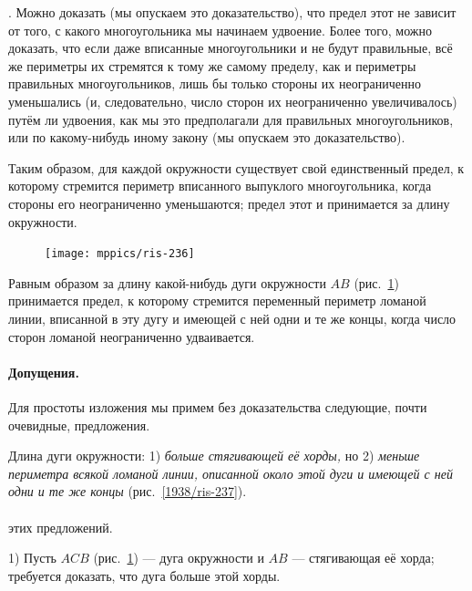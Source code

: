\documentclass[oneside]{book}
\begin{document}
.
Можно доказать (мы опускаем это доказательство), что предел этот не зависит от того, с какого многоугольника мы начинаем удвоение.
Более того, можно доказать, что если даже вписанные многоугольники и не будут правильные, всё же периметры их стремятся к тому же самому пределу, как и периметры правильных многоугольников, лишь бы только стороны их неограниченно уменьшались (и, следовательно, число сторон их неограниченно увеличивалось) путём ли удвоения, как мы это предполагали для правильных многоугольников, или по какому-нибудь иному закону (мы опускаем это доказательство).

Таким образом, для каждой окружности существует свой единственный предел, к которому стремится периметр вписанного выпуклого многоугольника, когда стороны его неограниченно уменьшаются;
предел этот и принимается за длину окружности.

\begin{figure}
\centering
\texttt{[image: mppics/ris-236]}
\caption{}\label{1938/ris-236}
\end{figure}

Равным образом за длину какой-нибудь дуги окружности $AB$ (рис.~\ref{1938/ris-236}) принимается предел, к которому стремится переменный периметр ломаной линии, вписанной в эту дугу и имеющей с ней одни и те же концы, когда число сторон ломаной неограниченно удваивается. %

\paragraph{Допущения.}\label{1938/235}
Для простоты изложения мы примем без доказательства следующие, почти очевидные, предложения. %

Длина дуги окружности:
1) \emph{больше стягивающей её хорды,} но 2) \emph{меньше периметра всякой ломаной линии, описанной около этой дуги и имеющей с ней одни и те же концы} (рис.~\ref{1938/ris-237}).

\paragraph{}\label{1938/236}
 этих предложений.

1) Пусть $ACB$ (рис.~\ref{1938/ris-236}) — дуга окружности и $AB$ — стягивающая её хорда;
требуется доказать, что дуга больше этой хорды.
\end{document}
